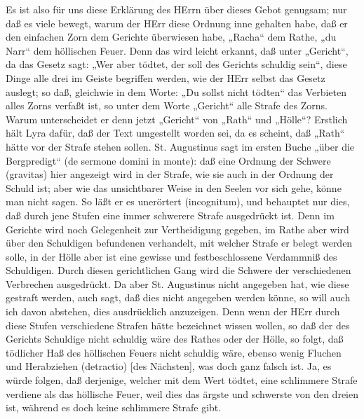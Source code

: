 Es ist also für uns diese Erklärung des HErrn über dieses Gebot genugsam; nur daß es viele bewegt, warum der HErr diese Ordnung inne gehalten habe, daß er den einfachen Zorn dem Gerichte überwiesen habe, „Racha“ dem Rathe, „du Narr“ dem höllischen Feuer. Denn das wird leicht erkannt, daß unter „Gericht“, da das Gesetz sagt: „Wer aber tödtet, der soll des Gerichts schuldig sein“, diese Dinge alle drei im Geiste begriffen werden, wie der HErr selbst das Gesetz auslegt; so daß, gleichwie in dem Worte: „Du sollst nicht tödten“ das Verbieten alles Zorns verfaßt ist, so unter dem Worte „Gericht“ alle Strafe des Zorns. Warum unterscheidet er denn jetzt „Gericht“ von „Rath“ und „Hölle“? Erstlich hält Lyra dafür, daß der Text umgestellt worden sei, da es scheint, daß „Rath“ hätte vor der Strafe stehen sollen. St. Augustinus sagt im ersten Buche „über die Bergpredigt“ (de sermone domini in monte): daß eine Ordnung der Schwere (gravitas) hier angezeigt wird in der Strafe, wie sie auch in der Ordnung der Schuld ist; aber wie das unsichtbarer Weise in den Seelen vor sich gehe, könne man nicht sagen. So läßt er es unerörtert (incognitum), und behauptet nur dies, daß durch jene Stufen eine immer schwerere Strafe ausgedrückt ist. Denn im Gerichte wird noch Gelegenheit zur Vertheidigung gegeben, im Rathe aber wird über den Schuldigen befundenen verhandelt, mit welcher Strafe er belegt werden solle, in der Hölle aber ist eine gewisse und festbeschlossene Verdammniß des Schuldigen. Durch diesen gerichtlichen Gang wird die Schwere der verschiedenen Verbrechen ausgedrückt. Da aber St. Augustinus nicht angegeben hat, wie diese gestraft werden, auch sagt, daß dies nicht angegeben werden könne, so will auch ich davon abstehen, dies ausdrücklich anzuzeigen. Denn wenn der HErr durch diese Stufen verschiedene Strafen hätte bezeichnet wissen wollen, so daß der des Gerichts Schuldige nicht schuldig wäre des Rathes oder der Hölle, so folgt, daß tödlicher Haß des höllischen Feuers nicht schuldig wäre, ebenso wenig Fluchen und Herabziehen (detractio) [des Nächsten], was doch ganz falsch ist. Ja, es würde folgen, daß derjenige, welcher mit dem Wert tödtet, eine schlimmere Strafe verdiene als das höllische Feuer, weil dies das ärgste und schwerste von den dreien ist, während es doch keine schlimmere Strafe gibt.

